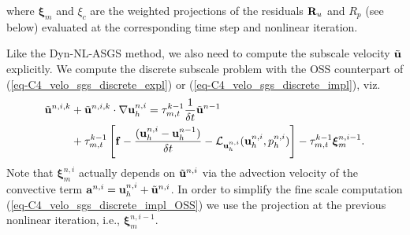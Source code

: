 where $\boldsymbol{\xi}_m$ and $\xi_c$ are the weighted projections of the residuals ${\bf R}_u$ and $R_p$ (see below) evaluated at the corresponding time step and nonlinear iteration. 

Like the Dyn-NL-ASGS method, we also need to compute the subscale velocity $\tilde{{\bf u}}$ explicitly. We compute the discrete subscale problem with the OSS counterpart of (\ref{eq-C4_velo_sgs_discrete_expl}) or (\ref{eq-C4_velo_sgs_discrete_impl}), viz. 
\begin{align}
\label{eq-C4_velo_sgs_discrete_impl_OSS}
\tilde{\mathbf{u}}^{n,i,k}
& + \tilde{{\bf u}}^{n,i,k}\cdot\nabla{\bf u}_h^{n,i}
  = \tau_{m,t}^{k-1} \frac{1}{\delta t} \tilde{\mathbf{u}}^{n-1} \\ \nonumber
& + \tau_{m,t}^{k-1} \left[\mathbf{f} - \frac{({\bf u}_h^{n,i}-{\bf u}_h^{n-1})}{\delta t} - \mathcal{L}_{{\bf u}_h^{n,i}}({\bf u}_h^{n,i},p_h^{n,i})\right]-\tau_{m,t}^{k-1}\boldsymbol{\xi}_m^{n,i-1}.
\end{align}
Note that $\boldsymbol{\xi}_m^{n,i}$ actually depends on $\tilde{{\bf u}}^{n,i}$ via the advection velocity of the convective term ${\bf a}^{n,i}={\bf u}_h^{n,i}+\tilde{{\bf u}}^{n,i}$. In order to simplify the fine scale computation (\ref{eq-C4_velo_sgs_discrete_impl_OSS}) we use the projection at the previous nonlinear iteration, i.e., $\boldsymbol{\xi}_m^{n,i-1}$. 

